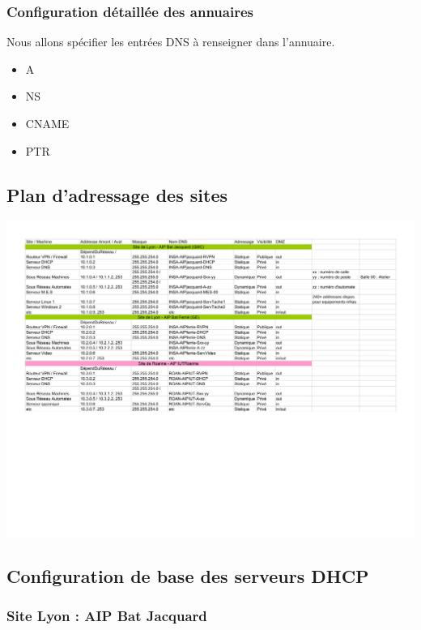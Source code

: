 \documentclass[a4paper]{article}
\begin{document}
\subsubsection{Configuration détaillée des annuaires}

Nous allons spécifier les entrées DNS à renseigner dans l'annuaire.

\begin{itemize}
\item A
\item NS
\item CNAME
\item PTR 
\end{itemize}

\subsection{Plan d'adressage des sites}

\begin{center}
\includegraphics[width=\linewidth]{Adressage.pdf}
\end{center}
 
\subsection{Configuration de base des serveurs DHCP}

\subsubsection{Site Lyon : AIP Bat Jacquard }
\end{document}
